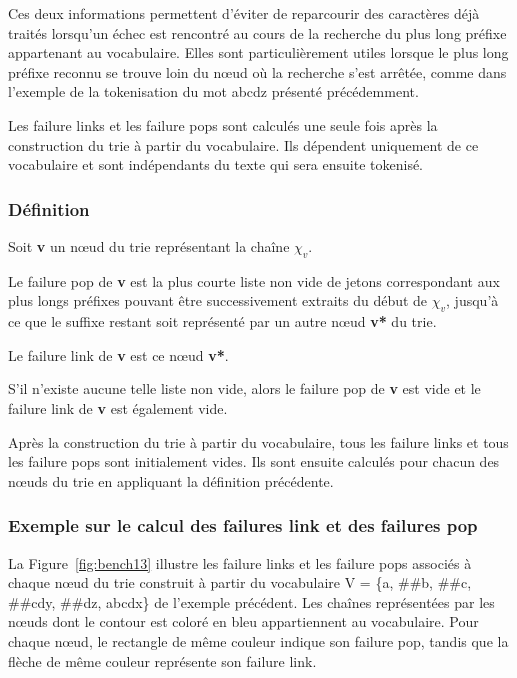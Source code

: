 \documentclass[12pt,a4paper]{report}
\begin{document}
	Ces deux informations permettent d'éviter de reparcourir des caractères déjà traités lorsqu'un échec est rencontré au cours de la recherche du plus long préfixe appartenant au vocabulaire. Elles sont particulièrement utiles lorsque le plus long préfixe reconnu se trouve loin du nœud où la recherche s'est arrêtée, comme dans l'exemple de la tokenisation du mot abcdz présenté précédemment.
	
	Les failure links et les failure pops sont calculés une seule fois après la construction du trie à partir du vocabulaire. Ils dépendent uniquement de ce vocabulaire et sont indépendants du texte qui sera ensuite tokenisé.
	
	\subsubsection{Définition}
	
	Soit \textbf{v} un nœud du trie représentant la chaîne \textbf{$\chi_v$}.
	
	Le failure pop de \textbf{v} est la plus courte liste non vide de jetons correspondant aux plus longs préfixes pouvant être successivement extraits du début de \textbf{$\chi_v$}, jusqu'à ce que le suffixe restant soit représenté par un autre nœud \textbf{v*} du trie.
	
	Le failure link de \textbf{v} est ce nœud \textbf{v*}.
	
	S'il n'existe aucune telle liste non vide, alors le failure pop de \textbf{v} est vide et le failure link de \textbf{v} est également vide.
	
	Après la construction du trie à partir du vocabulaire, tous les failure links et tous les failure pops sont initialement vides. Ils sont ensuite calculés pour chacun des nœuds du trie en appliquant la définition précédente.
	
	\subsubsection{Exemple sur le calcul des failures link et des failures pop}
	
	La Figure~\ref{fig:bench13} illustre les failure links et les failure pops associés à chaque nœud du trie construit à partir du vocabulaire V = \{a, \#\#b, \#\#c, \#\#cdy, \#\#dz, abcdx\} de l'exemple précédent. Les chaînes représentées par les nœuds dont le contour est coloré en bleu appartiennent au vocabulaire. Pour chaque nœud, le rectangle de même couleur indique son failure pop, tandis que la flèche de même couleur représente son failure link.
	
\end{document}
